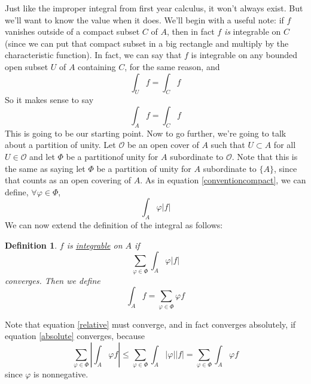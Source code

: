 \documentclass{article}
\newtheorem{definition}{Definition}
\newcommand{\mc}[1]{\mathcal{#1}}
\begin{document}
Just like the improper integral from first year calculus, it won't always exist. But we'll want to know the value when it does. We'll begin with a useful note: if \(f\) vanishes outside of a compact subset \(C\) of \(A\), then in fact \(f\) \textit{is} integrable on \(C\) (since we can put that compact subset in a big rectangle and multiply by the characteristic function). In fact, we can say that \(f\) is integrable on any bounded open subset \(U\) of \(A\) containing \(C\), for the same reason, and
\begin{equation}
  \int_Uf = \int_Cf
\end{equation}
So it makes sense to say
\begin{equation}
  \int_Af = \int_Cf
  \label{conventioncompact}
\end{equation}
This is going to be our starting point. Now to go further, we're going to talk about a partition of unity. Let \(\mc{O}\) be an open cover of \(A\) such that \(U \subset A\) for all \(U \in \mc{O}\) and let \(\Phi\) be a partitionof unity for \(A\) subordinate to \(\mc{O}\). Note that this is the same as saying let \(\Phi\) be a partition of unity for \(A\) subordinate to \(\{A\}\), since that counts as an open covering of \(A\). As in equation \ref{conventioncompact},
we can define, \(\forall \varphi \in \Phi\),
\begin{equation}
  \int_A\varphi|f|
\end{equation}
We can now extend the definition of the integral as follows:
\begin{definition}
  \(f\) is \underline{integrable} on \(A\) if
  \begin{equation}
    \sum_{\varphi \in \Phi}\int_A\varphi|f|
    \label{absolute}
  \end{equation}
  converges. Then we define
  \begin{equation}
    \int_Af = \sum_{\varphi \in \Phi}\varphi f
    \label{relative}
  \end{equation}
\end{definition}
Note that equation \ref{relative} must converge, and in fact converges absolutely, if equation \ref{absolute} converges, because
\begin{equation}
  \sum_{\varphi \in \Phi}\left|\int_A\varphi f\right| \leq \sum_{\varphi \in \Phi}\int_A|\varphi||f| = \sum_{\varphi \in \Phi}\int_A\varphi f
\end{equation}
since \(\varphi\) is nonnegative.
\end{document}
